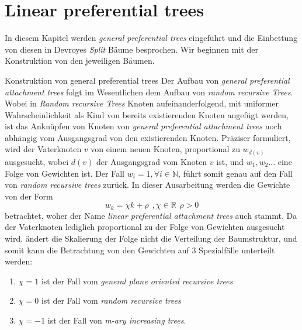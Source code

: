 \chapter{Linear preferential trees} 
In diesem Kapitel werden \textit{general preferential trees} eingeführt und die Einbettung von diesen in Devroyes \textit{Split} Bäume besprochen. Wir beginnen mit der Konstruktion von den jeweiligen Bäumen.
\begin{section}{Konstruktion von general preferential trees}
Der Aufbau von \textit{general preferential attachment trees} folgt im Wesentlichen dem Aufbau von \textit{random recursive Trees}. Wobei in \textit{Random recursive Trees} Knoten aufeinanderfolgend, mit uniformer Wahrscheinlichkeit als Kind von bereits existierenden Knoten angefügt werden, ist das Anknüpfen von Knoten von \textit{general preferential attachment trees} noch abhängig vom Ausgangsgrad von den existierenden Knoten. Präziser formuliert, wird der Vaterknoten $v$ von einem neuen Knoten, proportional zu $w_{d(v)}$ ausgesucht, wobei $d(v)$ der Ausgangsgrad vom Knoten $v$ ist, und $w_1, w_2...$ eine Folge von Gewichten ist. Der Fall $w_i = 1, \forall i \in \mathbb{N}$, führt somit genau auf den Fall von \textit{random recursive trees} zurück. In dieser Ausarbeitung werden die Gewichte von der Form 
\[
w_k = \chi k + \rho \hspace{5pt}, \chi \in \mathbb{R}\hspace{5pt} \rho > 0
\]
betrachtet, woher der Name \textit{linear preferential attachment trees} auch stammt. Da der Vaterknoten lediglich proportional zu der Folge von Gewichten ausgesucht wird, ändert die Skalierung der Folge nicht die Verteilung der Baumstruktur, und somit kann die Betrachtung von den Gewichten auf 3 Spezialfälle unterteilt werden:
\begin{enumerate}
    \item $\chi = 1$ ist der Fall vom \textit{general plane oriented recursive trees} \cite{panholzer2007level} 
    \item $\chi = 0$ ist der Fall vom \textit{random recursive trees}
    \item $\chi = -1$ ist der Fall von \textit{m-ary increasing trees}.
\end{enumerate}

\end{section}
